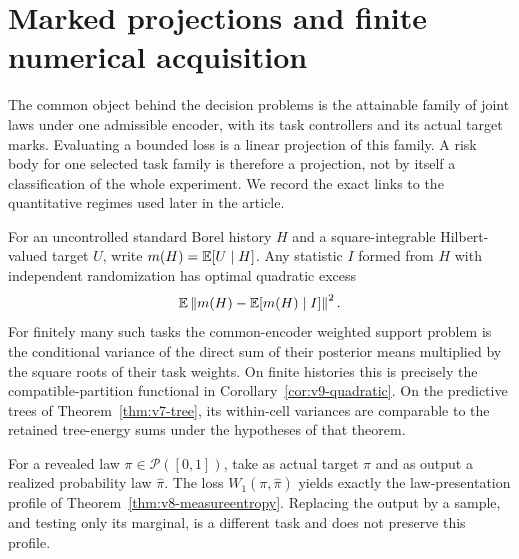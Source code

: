 \section{Marked projections and finite numerical acquisition}
\label{sec:v10-projections}

The common object behind the decision problems is the attainable
family of joint laws under one admissible encoder, with its task
controllers and its actual target marks. Evaluating a bounded loss is
a linear projection of this family. A risk body for one selected task
family is therefore a projection, not by itself a classification of
the whole experiment. We record the exact links to the quantitative
regimes used later in the article.

\begin{proposition}\label{prop:v10-projections}
For an uncontrolled standard Borel history $H$ and a square-integrable
Hilbert-valued target $U$, write $m(H)=\mathbb E[U\mid H]$. Any statistic $I$
formed from $H$ with independent randomization has optimal quadratic
excess
\begin{equation}\label{eq:v10-variance}
 \mathbb E\left\lVert m(H)-\mathbb E[m(H)\mid I]\right\rVert^2.
\end{equation}
For finitely many such tasks the common-encoder weighted support
problem is the conditional variance of the direct sum of their
posterior means multiplied by the square roots of their task weights.
On finite histories this is precisely the compatible-partition
functional in Corollary~\ref{cor:v9-quadratic}. On the predictive trees
of Theorem~\ref{thm:v7-tree}, its within-cell variances are comparable
to the retained tree-energy sums under the hypotheses of that theorem.

For a revealed law $\pi\in\mathcal P([0,1])$, take as actual target
$\pi$ and as output a realized probability law $\widehat\pi$.
The loss $W_1(\pi,\widehat\pi)$ yields exactly the law-presentation
profile of Theorem~\ref{thm:v8-measureentropy}. Replacing the output by
a sample, and testing only its marginal, is a different task and does
not preserve this profile.
\end{proposition}
